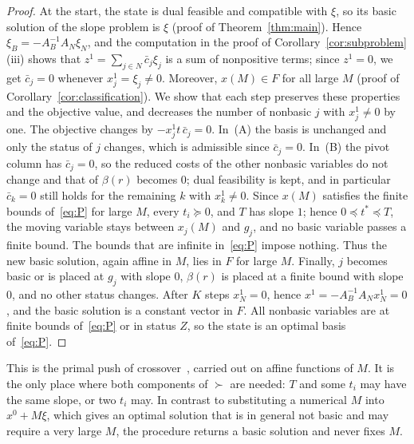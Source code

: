 \documentclass[11pt,a4paper]{article}
\theoremstyle{plain}
\theoremstyle{definition}
\theoremstyle{remark}
\begin{document}
\begin{proof}
At the start, the state is dual feasible and compatible with $\xi$, so its basic solution of the slope problem is $\xi$ (proof of Theorem~\ref{thm:main}). Hence $\xi_B=-A_B^{-1}A_N\xi_N$, and the computation in the proof of Corollary~\ref{cor:subproblem}(iii) shows that $z^1=\sum_{j\in N}\bar c_j\xi_j$ is a sum of nonpositive terms; since $z^1=0$, we get $\bar c_j=0$ whenever $x^1_j=\xi_j\neq0$. Moreover, $x(M)\in F$ for all large $M$ (proof of Corollary~\ref{cor:classification}). We show that each step preserves these properties and the objective value, and decreases the number of nonbasic $j$ with $x^1_j\neq0$ by one.
The objective changes by $-x^1_jt\,\bar c_j=0$. In~(A) the basis is unchanged and only the status of $j$ changes, which is admissible since $\bar c_j=0$. In~(B) the pivot column has $\bar c_j=0$, so the reduced costs of the other nonbasic variables do not change and that of $\beta(r)$ becomes $0$; dual feasibility is kept, and in particular $\bar c_k=0$ still holds for the remaining $k$ with $x^1_k\neq0$. Since $x(M)$ satisfies the finite bounds of~\eqref{eq:P} for large $M$, every $t_i\succeq0$, and $T$ has slope $1$; hence $0\preceq t^\ast\preceq T$, the moving variable stays between $x_j(M)$ and $g_j$, and no basic variable passes a finite bound. The bounds that are infinite in~\eqref{eq:P} impose nothing. Thus the new basic solution, again affine in $M$, lies in $F$ for large $M$. Finally, $j$ becomes basic or is placed at $g_j$ with slope $0$, $\beta(r)$ is placed at a finite bound with slope $0$, and no other status changes.
After $K$ steps $x^1_N=0$, hence $x^1=-A_B^{-1}A_Nx^1_N=0$, and the basic solution is a constant vector in $F$. All nonbasic variables are at finite bounds of~\eqref{eq:P} or in status $Z$, so the state is an optimal basis of~\eqref{eq:P}.
\end{proof}

This is the primal push of crossover~\cite{megiddo1991,bixby1994}, carried out on affine functions of $M$. It is the only place where both components of $\succ$ are needed: $T$ and some $t_i$ may have the same slope, or two $t_i$ may. In contrast to substituting a numerical $M$ into $x^0+M\xi$, which gives an optimal solution that is in general not basic and may require a very large $M$, the procedure returns a basic solution and never fixes $M$.
\end{document}
